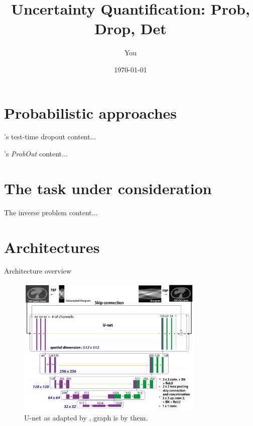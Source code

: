 \documentclass{beamer}
\title[Your Short Title]{Uncertainty Quantification: Prob, Drop, Det}
\author{You}
\institute{Where You're From}
\date{\today}
\begin{document}
	
	\begin{frame}
		\titlepage
	\end{frame}
	
	
	\section{Probabilistic approaches}
	\begin{frame}{\cite{gal_dropout_2015}'s test-time dropout}
		content...
	\end{frame}
	
	\begin{frame}{\cite{gast_lightweight_2018}'s \textit{ProbOut}}
		content...
	\end{frame}
	
	\section{The task under consideration}
	\begin{frame}{The inverse problem}
		content...
	\end{frame}
	
	\section{Architectures}
	\begin{frame}{Architecture overview}
		\begin{figure}
		\includegraphics[width=0.8\textwidth]{figures/jin-unet.png}
		\caption{\label{fig:jin-unet}U-net as adapted by \cite{jin_deep_2017}, graph is by them.}
		\end{figure}
	\end{frame}
	
\end{document}
